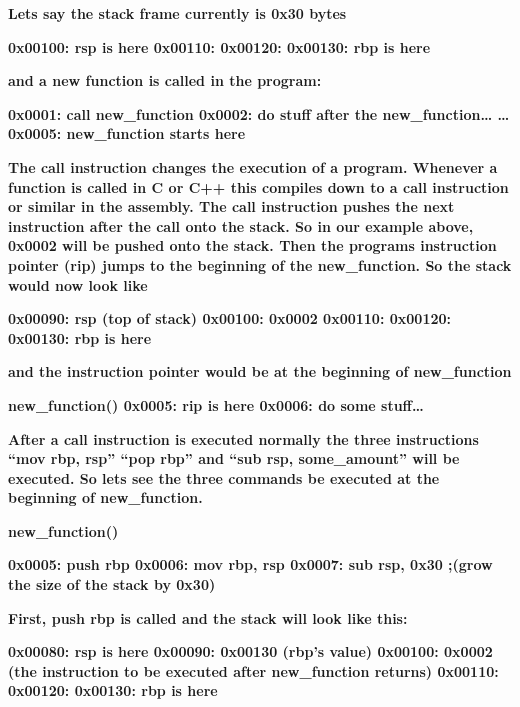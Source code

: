 \textbf{Lets say the stack frame currently is 0x30 bytes}

\textbf{0x00100: rsp is here\newline
0x00110:\newline
0x00120:\newline
0x00130: rbp is here}

\textbf{and a new function is called in the program:}

\textbf{0x0001: call new\_function\newline
0x0002: do stuff after the new\_function{\dots}\newline
{\dots} 0x0005: new\_function starts here}

\textbf{The call instruction changes the execution of a program. Whenever a function is called in C or C++ this compiles
down to a call instruction or similar in the assembly. The call instruction pushes the next instruction after the call
onto the stack. So in our example above, 0x0002 will be pushed onto the stack. Then the programs instruction pointer
(rip) jumps to the beginning of the new\_function. So the stack would now look like}

\textbf{0x00090: rsp (top of stack)\newline
0x00100: 0x0002\newline
0x00110:\newline
0x00120:\newline
0x00130: rbp is here}

\textbf{and the instruction pointer would be at the beginning of new\_function}

\textbf{new\_function()\newline
0x0005: rip is here\newline
0x0006: do some stuff{\dots}}

\textbf{After a call instruction is executed normally the three instructions ``mov rbp, rsp'' ``pop rbp'' and ``sub rsp,
some\_amount'' will be executed. So lets see the three commands be executed at the beginning of new\_function.}

\textbf{new\_function()}

\textbf{0x0005: push rbp\newline
0x0006: mov rbp, rsp\newline
0x0007: sub rsp, 0x30 ;(grow the size of the stack by 0x30)}

\textbf{First, push rbp is called and the stack will look like this:}

\textbf{0x00080: rsp is here\newline
0x00090: 0x00130 (rbp's value)\newline
0x00100: 0x0002 (the instruction to be executed after new\_function returns)\newline
0x00110:\newline
0x00120:\newline
0x00130: rbp is here}

